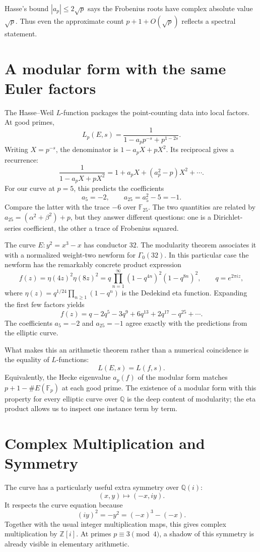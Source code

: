 Hasse's bound \(|a_p|\le2\sqrt p\) says the Frobenius roots have complex absolute value \(\sqrt p\). Thus even the approximate count \(p+1+O(\sqrt p)\) reflects a spectral statement.

\section{A modular form with the same Euler factors}

The Hasse--Weil \(L\)-function packages the point-counting data into local factors. At good primes,
\[
 L_p(E,s)=
 \frac{1}{1-a_pp^{-s}+p^{1-2s}}.
\]
Writing \(X=p^{-s}\), the denominator is \(1-a_pX+pX^2\). Its reciprocal gives a recurrence:
\[
 \frac{1}{1-a_pX+pX^2}
 =1+a_pX+(a_p^2-p)X^2+\cdots.
\]
For our curve at \(p=5\), this predicts the coefficients
\[
 a_5=-2,\qquad a_{25}=a_5^2-5=-1.
\]
Compare the latter with the trace \(-6\) over \(\mathbb F_{25}\). The two quantities are related by \(a_{25}=(\alpha^2+\beta^2)+p\), but they answer different questions: one is a Dirichlet-series coefficient, the other a trace of Frobenius squared.

The curve \(E:y^2=x^3-x\) has conductor \(32\). The modularity theorem associates it with a normalized weight-two newform for \(\Gamma_0(32)\). In this particular case the newform has the remarkably concrete product expression
\[
 \boxed{f(z)=\eta(4z)^2\eta(8z)^2
 =q\prod_{n=1}^{\infty}(1-q^{4n})^2(1-q^{8n})^2},
 \qquad q=e^{2\pi iz},
\]
where \(\eta(z)=q^{1/24}\prod_{n\ge1}(1-q^n)\) is the Dedekind eta function. Expanding the first few factors yields
\[
 f(z)=q-2q^5-3q^9+6q^{13}+2q^{17}-q^{25}+\cdots.
\]
The coefficients \(a_5=-2\) and \(a_{25}=-1\) agree exactly with the predictions from the elliptic curve.

What makes this an arithmetic theorem rather than a numerical coincidence is the equality of \(L\)-functions:
\[
 \boxed{L(E,s)=L(f,s).}
\]
Equivalently, the Hecke eigenvalue \(a_p(f)\) of the modular form matches
\(p+1-\#E(\mathbb F_p)\) at each good prime. The existence of a modular form with this property for every elliptic curve over \(\mathbb Q\) is the deep content of modularity; the eta product allows us to inspect one instance term by term.

\section{Complex Multiplication and Symmetry}

The curve has a particularly useful extra symmetry over \(\mathbb Q(i)\):
\[
 (x,y)\longmapsto(-x,iy).
\]
It respects the curve equation because
\[
 (iy)^2=-y^2=(-x)^3-(-x).
\]
Together with the usual integer multiplication maps, this gives complex multiplication by \(\mathbb Z[i]\). At primes \(p\equiv3\pmod4\), a shadow of this symmetry is already visible in elementary arithmetic.

